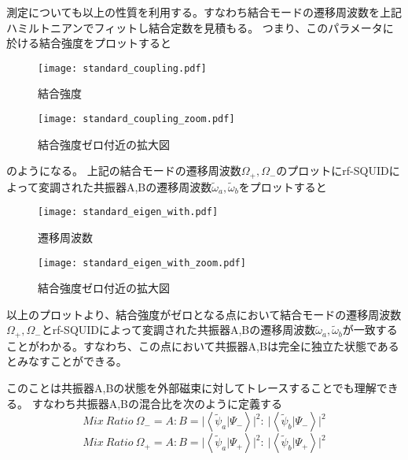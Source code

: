 測定についても以上の性質を利用する。すなわち結合モードの遷移周波数を上記ハミルトニアンでフィットし結合定数を見積もる。
つまり、このパラメータに於ける結合強度をプロットすると
\begin{figure}[H]
    \begin{minipage}[t]{0.5\columnwidth}
        \centering
        \texttt{[image: standard\_coupling.pdf]}
        \caption{結合強度}
    \end{minipage}%
    \begin{minipage}[t]{0.5\columnwidth}
        \centering
        \texttt{[image: standard\_coupling\_zoom.pdf]}
        \caption{結合強度ゼロ付近の拡大図}
    \end{minipage}
\end{figure}
のようになる。
上記の結合モードの遷移周波数$\Omega_{+},\Omega_{-}$のプロットにrf-SQUIDによって変調された共振器A,Bの遷移周波数$\tilde{\omega}_a,\tilde{\omega}_b$をプロットすると
\begin{figure}[H]
    \begin{minipage}[t]{0.5\columnwidth}
        \centering
        \texttt{[image: standard\_eigen\_with.pdf]}
        \caption{遷移周波数}
    \end{minipage}%
    \begin{minipage}[t]{0.5\columnwidth}
        \centering
        \texttt{[image: standard\_eigen\_with\_zoom.pdf]}
        \caption{結合強度ゼロ付近の拡大図}
    \end{minipage}
\end{figure}
以上のプロットより、結合強度がゼロとなる点において結合モードの遷移周波数$\Omega_{+},\Omega_{-}$とrf-SQUIDによって変調された共振器A,Bの遷移周波数$\tilde{\omega}_a,\tilde{\omega}_b$が一致することがわかる。すなわち、この点において共振器A,Bは完全に独立た状態であるとみなすことができる。

このことは共振器A,Bの状態を外部磁束に対してトレースすることでも理解できる。
すなわち共振器A,Bの混合比を次のように定義する
\begin{equation}
    Mix\ Ratio\ \Omega_{-} = A:B  = \biggl|\left\langle \tilde{\psi}_a|\Psi_{-}\right\rangle \biggr|^2: \  \biggl|\left\langle \tilde{\psi}_b|\Psi_{-}\right\rangle \biggr|^2 
\end{equation}
\begin{equation}
    Mix\ Ratio\ \Omega_{+} = A:B  = \biggl|\left\langle \tilde{\psi}_a|\Psi_{+}\right\rangle \biggr|^2: \  \biggl|\left\langle \tilde{\psi}_b|\Psi_{+}\right\rangle \biggr|^2 
\end{equation}

